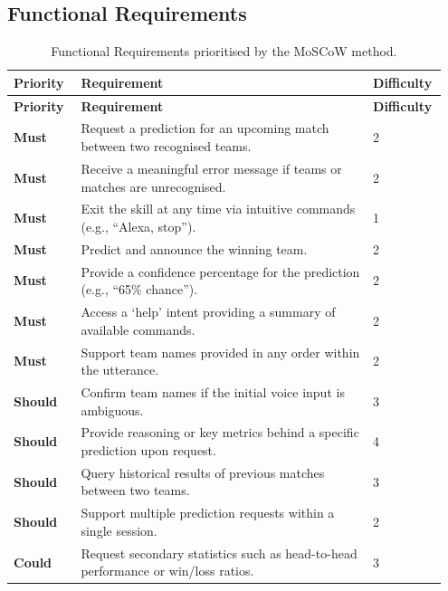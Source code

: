 \subsection{Functional Requirements}
{
\renewcommand{\arraystretch}{1.3}
\begin{longtable}{@{} p{0.15\linewidth} p{0.65\linewidth} p{0.15\linewidth} @{} }
\caption{Functional Requirements prioritised by the MoSCoW method.} \label{tab:functional_req} \\
\toprule
\textbf{Priority} & \textbf{Requirement} & \textbf{Difficulty} \\
\midrule
\endfirsthead

\toprule
\textbf{Priority} & \textbf{Requirement} & \textbf{Difficulty} \\
\midrule
\endhead

\bottomrule
\endfoot

\cellcolor{green!15}\textbf{Must} & Request a prediction for an upcoming match between two recognised teams. & 2 \\
\cellcolor{green!15}\textbf{Must} & Receive a meaningful error message if teams or matches are unrecognised. & 2 \\
\cellcolor{green!15}\textbf{Must} & Exit the skill at any time via intuitive commands (e.g., ``Alexa, stop''). & 1 \\
\cellcolor{green!15}\textbf{Must} & Predict and announce the winning team. & 2 \\
\cellcolor{green!15}\textbf{Must} & Provide a confidence percentage for the prediction (e.g., ``65\% chance''). & 2 \\
\cellcolor{green!15}\textbf{Must} & Access a `help' intent providing a summary of available commands. & 2 \\
\cellcolor{green!15}\textbf{Must} & Support team names provided in any order within the utterance. & 2 \\ \addlinespace
\cellcolor{yellow!15}\textbf{Should} & Confirm team names if the initial voice input is ambiguous. & 3 \\
\cellcolor{yellow!15}\textbf{Should} & Provide reasoning or key metrics behind a specific prediction upon request. & 4 \\
\cellcolor{yellow!15}\textbf{Should} & Query historical results of previous matches between two teams. & 3 \\
\cellcolor{yellow!15}\textbf{Should} & Support multiple prediction requests within a single session. & 2 \\ \addlinespace
\cellcolor{orange!15}\textbf{Could} & Request secondary statistics such as head-to-head performance or win/loss ratios. & 3 \\
\end{longtable}
}

